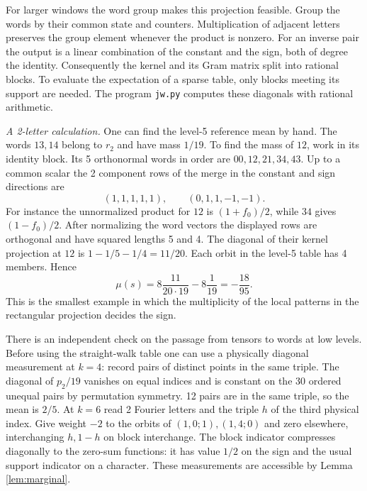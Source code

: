 \documentclass[11pt,a4paper]{amsart}
\begin{document}
For larger windows the word group makes this projection feasible. Group the words by their common state and counters. Multiplication of adjacent letters preserves the group element whenever the product is nonzero. For an inverse pair the output is a linear combination of the constant and the sign, both of degree the identity. Consequently the kernel and its Gram matrix split into rational blocks. To evaluate the expectation of a sparse table, only blocks meeting its support are needed. The program \texttt{jw.py} computes these diagonals with rational arithmetic.

\smallskip\noindent\textit{A 2-letter calculation.}
One can find the level-5 reference mean by hand. The words $13,14$ belong to $r_2$ and have mass $1/19$. To find the mass of $12$, work in its identity block. Its 5 orthonormal words in order are $00,12,21,34,43$. Up to a common scalar the 2 component rows of the merge in the constant and sign directions are
\[
 (1,1,1,1,1),\qquad (0,1,1,-1,-1).
\]
For instance the unnormalized product for $12$ is $(1+f_0)/2$, while $34$ gives $(1-f_0)/2$. After normalizing the word vectors the displayed rows are orthogonal and have squared lengths 5 and 4. The diagonal of their kernel projection at $12$ is $1-1/5-1/4=11/20$. Each orbit in the level-5 table has 4 members. Hence
\[
 \mu(s)=8\frac{11}{20\cdot19}-8\frac1{19}=-\frac{18}{95}.
\]
This is the smallest example in which the multiplicity of the local patterns in the rectangular projection decides the sign.

There is an independent check on the passage from tensors to words at low levels. Before using the straight-walk table one can use a physically diagonal measurement at $k=4$: record pairs of distinct points in the same triple. The diagonal of $p_2/19$ vanishes on equal indices and is constant on the 30 ordered unequal pairs by permutation symmetry. 12 pairs are in the same triple, so the mean is $2/5$. At $k=6$ read 2 Fourier letters and the triple $h$ of the third physical index. Give weight $-2$ to the orbits of $(1,0;1),(1,4;0)$ and zero elsewhere, interchanging $h,1-h$ on block interchange. The block indicator compresses diagonally to the zero-sum functions: it has value $1/2$ on the sign and the usual support indicator on a character. These measurements are accessible by Lemma \ref{lem:marginal}.
\end{document}

